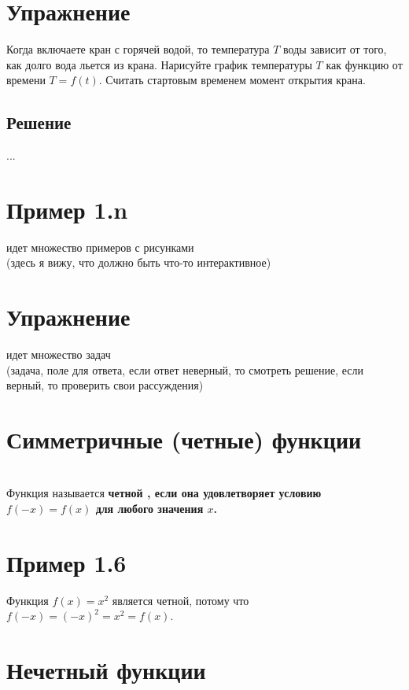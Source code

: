 \documentclass[a4paper,14pt]{report}
\begin{document}
\section*{ Упражнение}
 Когда включаете кран с горячей водой, то температура $T$ воды зависит от того, как долго вода льется из крана. Нарисуйте график температуры $T$ как функцию от времени $T = f(t)$. Считать стартовым временем момент открытия крана. 
 
\subsection*{ Решение}
...

\section*{ Пример 1.n}
идет множество примеров с рисунками\\
(здесь я вижу, что должно быть что-то интерактивное)


\section*{ Упражнение}
идет множество задач\\
(задача, поле для ответа, если ответ неверный, то смотреть решение, если верный, то проверить свои рассуждения)


\section*{\colorbox{light-blue}{Симметричные (четные) функции}}
\section*{ }
\noindent
Функция называется \bf четной \rm, если она удовлетворяет условию $f(-x) = f(x)$ для любого значения $x$.
\section*{ Пример 1.6}
Функция $f(x) = x^2$ является четной, потому что $f(-x) = (-x)^2 = x^2 = f(x)$.

\section*{\colorbox{light-blue}{Нечетный функции}}
\end{document}
